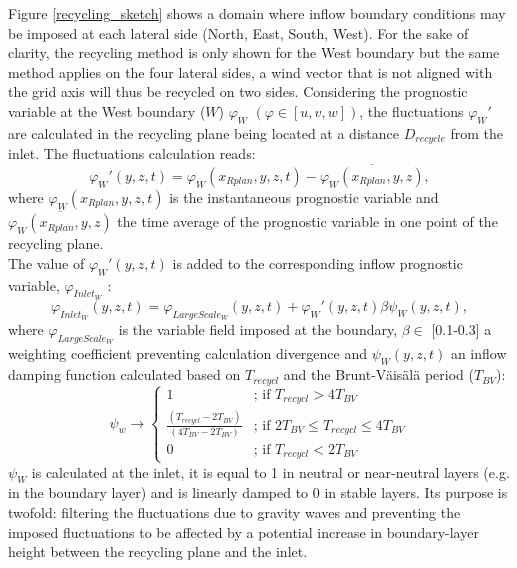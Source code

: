 Figure \ref{recycling_sketch} shows a domain where inflow boundary conditions may be imposed at each lateral side (North, East, South, West). For the sake of clarity, the recycling method is only shown for the West boundary but the same method applies on the four lateral sides, a wind vector that is not aligned with the grid axis will thus be recycled on two sides. Considering the prognostic variable at the West boundary ($W$) $\varphi_W$ $\left(\varphi \in [u,v,w] \right)$,
the fluctuations $\varphi_W'$ are calculated in the recycling plane being located at a distance $D_{recycle}$ from the inlet. The fluctuations calculation reads:
\begin{equation}
\label{fluct}
\varphi_W'(y,z,t)  =  \varphi_W(x_{Rplan},y,z,t)-\overline{\varphi_W(x_{Rplan},y,z)},
\end{equation}
where $\varphi_W(x_{Rplan},y,z,t)$ is the instantaneous prognostic variable and $\overline{\varphi_W(x_{Rplan},y,z)}$ the time average of the prognostic variable in one point of the recycling plane.
\\The value of $\varphi_W'(y,z,t)$ is added to the corresponding inflow prognostic variable, $\varphi_{Inlet_W}$ :  
\begin{equation}
\label{InletField}
\varphi_{Inlet_W}(y,z,t)  =  \varphi_{LargeScale_W}(y,z,t)+\varphi_W'(y,z,t)\beta\psi_W(y,z,t),
\end{equation}
where $\varphi_{LargeScale_W}$ is the variable field imposed at the boundary, $\beta \in$ [0.1-0.3] a weighting coefficient preventing calculation divergence and $\psi_W(y,z,t)$ an inflow damping function calculated based on $T_{recycl}$ and the Brunt-V{\"a}is{\"a}l{\"a} period ($T_{BV}$): 
\begin{equation}
\label{dampingFunction}
\psi_w \rightarrow \left\{
    \begin{array}{ll}
        1 & \mbox{; if } T_{recycl}>4T_{BV} \\
        \frac{\displaystyle \left(T_{recycl}-2T_{BV} \right)}{\displaystyle \left(4T_{BV}-2T_{BV}\right)} & \mbox{; if } 2T_{BV} \leq T_{recycl} \leq 4T_{BV} \\
        0 & \mbox{; if } T_{recycl} < 2T_{BV}
    \end{array}
\right.  
\end{equation}
$\psi_W$ is calculated at the inlet, it is equal to 1 in neutral or near-neutral layers (e.g. in the boundary layer) and is linearly damped to 0 in stable layers. Its purpose is twofold: filtering the fluctuations due to gravity waves and preventing the imposed fluctuations to be affected by a potential increase in boundary-layer height between the recycling plane and the inlet.
